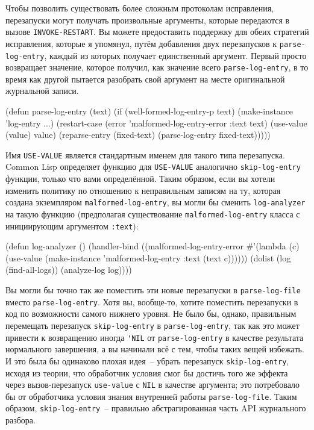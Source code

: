 Чтобы позволить существовать более сложным протоколам исправления, перезапуски могут
получать произвольные аргументы, которые передаются в вызове \lstinline{INVOKE-RESTART}. Вы
можете предоставить поддержку для обеих стратегий исправления, которые я упомянул, путём
добавления двух перезапусков к \lstinline{parse-log-entry}, каждый из которых получает
единственный аргумент. Первый просто возвращает значение, которое получил, как значение
всего \lstinline{parse-log-entry}, в то время как другой пытается разобрать свой аргумент на
месте оригинальной журнальной записи.

\begin{myverb}
(defun parse-log-entry (text)
  (if (well-formed-log-entry-p text)
    (make-instance 'log-entry ...)
    (restart-case (error 'malformed-log-entry-error :text text)
      (use-value (value) value)
      (reparse-entry (fixed-text) (parse-log-entry fixed-text)))))
\end{myverb}

Имя \lstinline{USE-VALUE} является стандартным именем для такого типа перезапуска. Common Lisp
определяет функцию для \lstinline{USE-VALUE} аналогично \lstinline{skip-log-entry} функции, только
что вами определённой. Таким образом, если вы хотели изменить политику по отношению к
неправильным записям на ту, которая создана экземпляром \lstinline{malformed-log-entry}, вы
могли бы сменить \lstinline{log-analyzer} на такую функцию (предполагая существование
\lstinline{malformed-log-entry} класса с инициирующим аргументом \lstinline{:text}):

\begin{myverb}
(defun log-analyzer ()
  (handler-bind ((malformed-log-entry-error
                  #'(lambda (c)
                      (use-value
                       (make-instance 'malformed-log-entry :text (text c))))))
    (dolist (log (find-all-logs))
      (analyze-log log))))
\end{myverb}

Вы могли бы точно так же поместить эти новые перезапуски в \lstinline{parse-log-file} вместо
\lstinline{parse-log-entry}. Хотя вы, вообще-то, хотите поместить перезапуски в код
по возможности самого нижнего уровня. Не было бы, однако, правильным перемещать перезапуск
\lstinline{skip-log-entry} в \lstinline{parse-log-entry}, так как это может привести к возвращению
иногда \lstinline{'NIL} от \lstinline{parse-log-entry} в качестве результата нормального завершения,
а вы начинали всё с тем, чтобы таких вещей избежать. И это была бы одинаково плохая идея~--
убрать перезапуск \lstinline{skip-log-entry}, исходя из теории, что обработчик условия смог бы
достичь того же эффекта через вызов-перезапуск \lstinline{use-value} с \lstinline{NIL} в качестве
аргумента; это потребовало бы от обработчика условия знания внутренней работы
\lstinline{parse-log-file}. Таким образом, \lstinline{skip-log-entry}~-- правильно абстрагированная
часть API журнального разбора.

